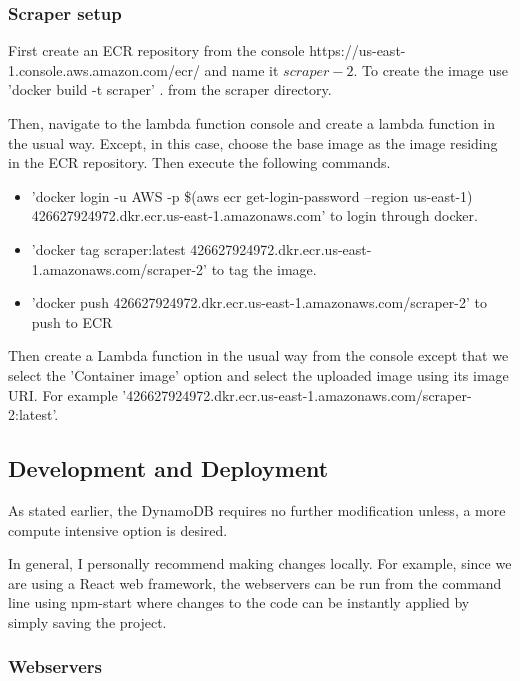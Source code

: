 \documentclass[12pt]{article}
\begin{document}
\subsubsection{Scraper setup}

First create an ECR repository from the console \newline https://us-east-1.console.aws.amazon.com/ecr/ and name it $scraper-2$. To create the image use 'docker build -t scraper' . from the scraper directory. 

Then, navigate to the lambda function console and create a lambda function in the usual way. Except, in this case, choose the base image as the image residing in the ECR repository. Then execute the following commands.

\begin{itemize}
    \item 'docker login -u AWS -p \$(aws ecr get-login-password --region us-east-1) 426627924972.dkr.ecr.us-east-1.amazonaws.com' to login through docker.
    \item 'docker tag scraper:latest 426627924972.dkr.ecr.us-east-1.amazonaws.com/scraper-2' to tag the image.
    \item 'docker push 426627924972.dkr.ecr.us-east-1.amazonaws.com/scraper-2' to push to ECR
\end{itemize}

Then create a Lambda function in the usual way from the console except that we select the 'Container image' option and select the uploaded image using its image URI. For example '426627924972.dkr.ecr.us-east-1.amazonaws.com/scraper-2:latest'.

\subsection{Development and Deployment}

As stated earlier, the DynamoDB requires no further modification unless, a more compute intensive option is desired.

In general, I personally recommend making changes locally. For example, since we are using a React web framework, the webservers can be run from the command line using npm-start where changes to the code can be instantly applied by simply saving the project. 

\subsubsection{Webservers}
\end{document}
